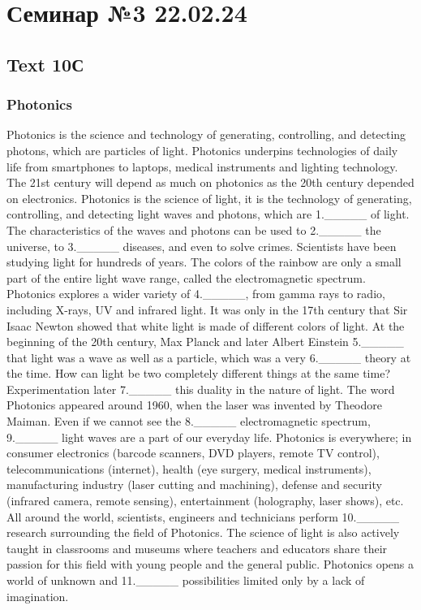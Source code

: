 \chapter{Семинар №3 22.02.24}

\section*{Text 10С}

\subsection*{Photonics}
Photonics is the science and technology of generating, controlling, and detecting
photons, which are particles of light. Photonics underpins technologies of daily life from smartphones
to laptops, medical instruments and lighting technology. The 21st century will depend as much
on photonics as the 20th century depended on electronics.
Photonics is the science of light, it is the technology of generating, controlling, and detecting light
waves and photons, which are 1.\_\_\_\_\_ of light. The characteristics of the waves and
photons can be used to 2.\_\_\_\_\_ the universe, to 3.\_\_\_\_\_ diseases, and even to solve
crimes. Scientists have been studying light for hundreds of years. The colors of the rainbow are only
a small part of the entire light wave range, called the electromagnetic spectrum. Photonics explores
a wider variety of 4.\_\_\_\_\_, from gamma rays to radio, including X-rays, UV and infrared
light. It was only in the 17th century that Sir Isaac Newton showed that white light is made of
different colors of light. At the beginning of the 20th century, Max Planck and later Albert Einstein
5.\_\_\_\_\_ that light was a wave as well as a particle, which was a very 6.\_\_\_\_\_
theory at the time. How can light be two completely different things at the same time?
Experimentation later 7.\_\_\_\_\_ this duality in the nature of light.
The word Photonics appeared around 1960, when the laser was invented by Theodore Maiman.
Even if we cannot see the 8.\_\_\_\_\_ electromagnetic spectrum, 9.\_\_\_\_\_ light waves
are a part of our everyday life. Photonics is everywhere; in consumer electronics (barcode scanners,
DVD players, remote TV control), telecommunications (internet), health (eye surgery, medical
instruments), manufacturing industry (laser cutting and machining), defense and security (infrared
camera, remote sensing), entertainment (holography, laser shows), etc.
All around the world, scientists, engineers and technicians perform 10.\_\_\_\_\_ research
surrounding the field of Photonics. The science of light is also actively taught in classrooms and
museums where teachers and educators share their passion for this field with young people and the
general public. Photonics opens a world of unknown and 11.\_\_\_\_\_ possibilities limited
only by a lack of imagination.

